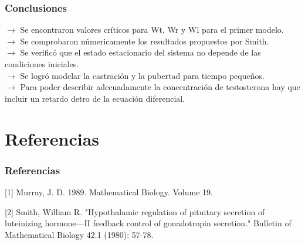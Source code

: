 \documentclass[10pt]{beamer}
\begin{document}
\begin{frame}
\frametitle{Conclusiones}
$\rightarrow$ Se encontraron valores críticos para Wt, Wr y Wl para el primer modelo.\\
$\rightarrow$ Se comprobaron númericamente los resultados propuestos por Smith.\\
$\rightarrow$ Se verificó que el estado estacionario del sistema no depende de las condiciones iniciales.\\
$\rightarrow$ Se logró modelar la castración y la pubertad para tiempo pequeños.\\
$\rightarrow$ Para poder describir adecuadamente la concentración de testosterona hay que incluir un retardo detro de la ecuación diferencial.\\
\end{frame}

\section{Referencias}
\begin{frame}
\frametitle{Referencias}
[1] Murray, J. D. 1989. Mathematical Biology. Volume 19. 

[2] Smith, William R. "Hypothalamic regulation of pituitary secretion of luteinizing hormone—II feedback control of gonadotropin secretion." Bulletin of Mathematical Biology 42.1 (1980): 57-78.
\end{frame}
\end{document}
